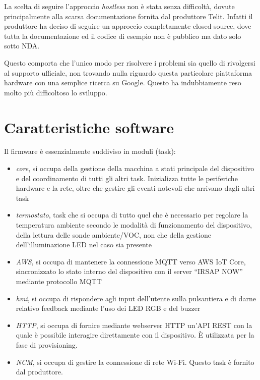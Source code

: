 \documentclass[12pt,a4paper,twoside,titlepage]{book}
\begin{document}
La scelta di seguire l'approccio \textit{hostless} non è stata senza difficoltà, dovute
principalmente alla scarsa documentazione fornita dal produttore Telit. Infatti il
produttore ha deciso di seguire un approccio completamente closed-source, dove tutta
la documentazione ed il codice di esempio non è pubblico ma dato solo sotto NDA.

Questo comporta che l'unico modo per risolvere i problemi sia quello di rivolgersi
al supporto ufficiale, non trovando nulla riguardo questa particolare piattaforma
hardware con una semplice ricerca su Google. Questo ha indubbiamente reso molto più
difficoltoso lo sviluppo.

\section{Caratteristiche software}

Il firmware è essenzialmente suddiviso in moduli (task):

\begin{itemize}
    \item \textit{core}, si occupa della gestione della macchina a stati principale
        del dispositivo e del coordinamento di tutti gli altri task. Inizializza tutte
        le periferiche hardware e la rete, oltre che gestire
        gli eventi notevoli che arrivano dagli altri task
    \item \textit{termostato}, task che si occupa di tutto quel che è necessario
        per regolare la temperatura ambiente secondo le modalità di funzionamento del dispositivo,
        della lettura delle sonde ambiente/VOC, non che della gestione dell'illuminazione LED
        nel caso sia presente
    \item \textit{AWS}, si occupa di mantenere la connessione MQTT verso AWS IoT Core,
        sincronizzato lo stato interno del dispositivo con il server ``IRSAP NOW'' mediante protocollo MQTT
    \item \textit{hmi}, si occupa di rispondere agli input dell'utente
        sulla pulsantiera e di darne relativo feedback mediante l'uso dei LED RGB e del buzzer
    \item \textit{HTTP}, si occupa di fornire mediante webserver HTTP un'API REST con
        la quale è possibile interagire direttamente con il dispositivo. È utilizzata
        per la fase di provisioning.
    \item \textit{NCM}, si occupa di gestire la connessione di rete Wi-Fi. Questo task
        è fornito dal produttore.
\end{itemize}
\end{document}
